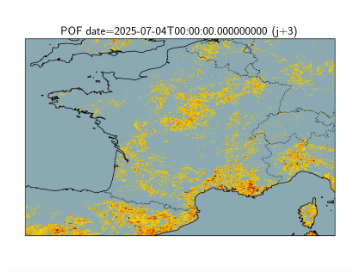 \documentclass{article}
\begin{document}
\begin{figure}[H]
\begin{subfigure}[b]{0.32\textwidth}
    \end{subfigure}
    \begin{subfigure}[b]{0.32\textwidth}
        \centering
        \includegraphics[width=\linewidth]{general_pof_j3.png} %
    \end{subfigure}
\end{figure}
\end{document}
